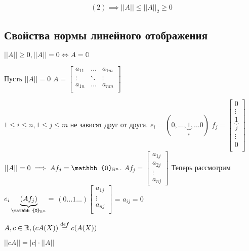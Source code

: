 \documentclass[main]{subfiles}
\begin{document}
\[(2) \implies ||A|| \leq ||A||_2 \geq 0\]

\subsection{Свойства нормы линейного отображения}
 \begin{theorem}$||A|| \geq 0, ||A|| = 0 \Leftrightarrow A = \mathbb{0}$ \end{theorem}
    \begin{longProof}
        Пусть $||A|| = 0$ 
        $A = \begin{bmatrix}
            a_{11} & \ldots & a_{1m} \\
            \vdots & \ddots & \vdots \\
            a_{1n} & \ldots & a_{nm} \\
        \end{bmatrix}$
        
        $1 \leq i \leq n, 1 \leq j \leq m$ не зависят друг от друга.
        \newline
        $e_i = (0, \ldots, \underbrace{1}_i, \ldots 0)$
        $f_j = \begin{bmatrix}
            0 \\
            \vdots \\
            \underbrace{1}_j \\
            \vdots \\
            0 \\ \end{bmatrix}$
        \newline
        $||A|| = 0 \implies Af_j = \mathbb{0}_{{\vR}^n} $.
        $Af_j =
        \begin{bmatrix}
            a_{1j} \\
            a_{2j}\\
            \vdots \\
            a_{nj}
        \end{bmatrix} $
        Теперь рассмотрим $e_i \underbrace{(Af_j)}_{\mathbb{0}_{{\vR}^n}} =$
        $ (0 \ldots 1 \ldots) \begin{bmatrix}
            a_{1j} \\
            \vdots \\
            a_{nj} \\ \end{bmatrix}$ = $a_{ij} = 0$
    \end{longProof}
    $A, c \in {\mathbb{R}}, (cA(X)) \stackrel{def}{=} c(A(X))$ 
    \begin{theorem}$||cA|| = |c| \cdot ||A||$ \end{theorem}
\end{document}
